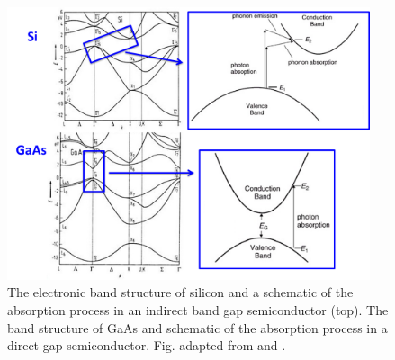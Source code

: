 \documentclass[11pt, twoside]{report}
\begin{document}
\begin{figure}[h!]
  \centering
    \includegraphics[width=0.95\textwidth]{figures/Si_and_GaAs.png}
    \caption[The electronic band structure of silicon and a schematic of the absorption process in an indirect band gap semiconductor (top). The band structure of GaAs and schematic of the absorption process in a direct gap semiconductor.]{The electronic band structure of silicon and a schematic of the absorption process in an indirect band gap semiconductor (top). The band structure of GaAs and schematic of the absorption process in a direct gap semiconductor. Fig. adapted from  and .}
  \label{Si_and_GaAs}
\end{figure}
\end{document}
